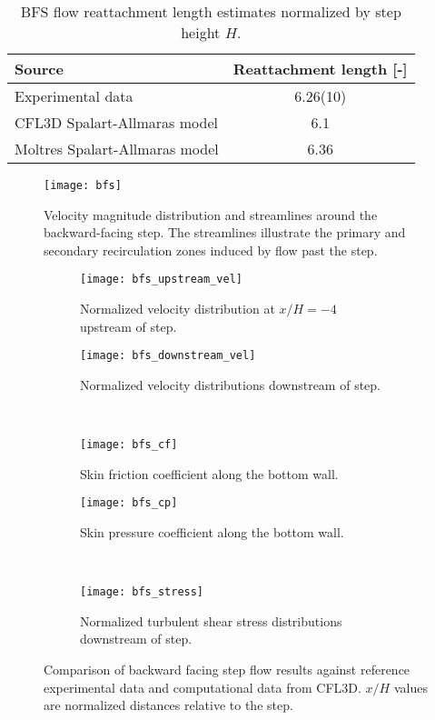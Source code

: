 \begin{table}[htb]
  \centering
  \small
  \caption{\gls{BFS} flow reattachment length estimates normalized by step height $H$.}
  \begin{tabular}{l S[table-format=1.2(2)]}
    \toprule
    Source & {Reattachment length [-]} \\
    \midrule
    Experimental data \cite{driver_features_1985} & 6.26(10) \\
    CFL3D Spalart-Allmaras model \cite{rumsey_turbulence_nodate} & 6.1 \\
    Moltres Spalart-Allmaras model & 6.36 \\
    \bottomrule
  \end{tabular}
  \label{table:bfs-reattach}
\end{table}

\begin{figure}[htb!]
  \centering
  \texttt{[image: bfs]}
  \caption{Velocity magnitude distribution and streamlines around the backward-facing step. The
  streamlines illustrate the primary and secondary recirculation zones induced by flow past the
  step.}
  \label{fig:bfs}
\end{figure}

\begin{figure}[htb]
  \centering
  \hfill
  \begin{subfigure}[b]{0.369\columnwidth}
    \centering
    \texttt{[image: bfs\_upstream\_vel]}
    \caption{Normalized velocity distribution at $x/H=-4$ upstream of step.}
    \label{fig:bfs-upstream}
  \end{subfigure}
  \hfill
  \begin{subfigure}[b]{0.369\columnwidth}
    \centering
    \texttt{[image: bfs\_downstream\_vel]}
    \caption{Normalized velocity distributions downstream of step.}
    \label{fig:bfs-downstream}
  \end{subfigure} \hfill \\
  \centering
  \hfill
  \begin{subfigure}[b]{0.369\columnwidth}
    \centering
    \texttt{[image: bfs\_cf]}
    \caption{Skin friction coefficient along the bottom wall.}
    \label{fig:bfs-cf}
  \end{subfigure}
  \hfill
  \begin{subfigure}[b]{0.369\columnwidth}
    \centering
    \texttt{[image: bfs\_cp]}
    \caption{Skin pressure coefficient along the bottom wall.}
    \label{fig:bfs-cp}
  \end{subfigure} \hfill \\
  \centering
  \begin{subfigure}[b]{0.369\columnwidth}
    \centering
    \texttt{[image: bfs\_stress]}
    \caption{Normalized turbulent shear stress distributions downstream
    of step.}
    \label{fig:bfs-stress}
  \end{subfigure}
  \caption{Comparison of backward facing step flow results against reference
  experimental data and computational data from CFL3D. $x/H$ values are normalized
  distances relative to the step.}
  \label{fig:bfs-plots}
\end{figure}

